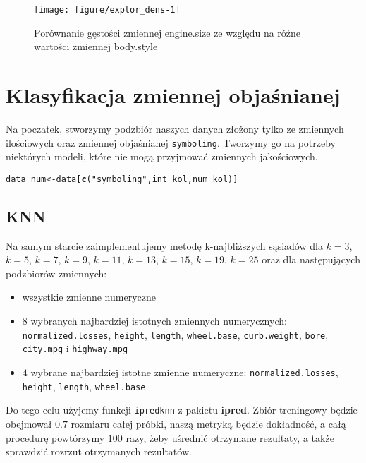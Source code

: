 \documentclass[12pt, a4paper]{article}\usepackage[]{graphicx}\usepackage[]{xcolor}
\makeatletter
\def\maxwidth{ %
  \ifdim\Gin@nat@width>\linewidth
    \linewidth
  \else
    \Gin@nat@width
  \fi
}
\newcommand{\hlstr}[1]{\textcolor[rgb]{0.192,0.494,0.8}{#1}}%
\newcommand{\hlstd}[1]{\textcolor[rgb]{0.345,0.345,0.345}{#1}}%
\newcommand{\hlkwb}[1]{\textcolor[rgb]{0.69,0.353,0.396}{#1}}%
\newcommand{\hlkwd}[1]{\textcolor[rgb]{0.737,0.353,0.396}{\textbf{#1}}}%
\newenvironment{kframe}{%
 \def\at@end@of@kframe{}%
 \ifinner\ifhmode%
  \def\at@end@of@kframe{\end{minipage}}%
  \begin{minipage}{\columnwidth}%
 \fi\fi%
 \def\FrameCommand##1{\hskip\@totalleftmargin \hskip-\fboxsep
 \colorbox{shadecolor}{##1}\hskip-\fboxsep
     \hskip-\linewidth \hskip-\@totalleftmargin \hskip\columnwidth}%
 \MakeFramed {\advance\hsize-\width
   \@totalleftmargin\z@ \linewidth\hsize
   \@setminipage}}%
 {\par\unskip\endMakeFramed%
 \at@end@of@kframe}
\newenvironment{knitrout}{}{} %
\makeatother
\begin{document}
\begin{knitrout}
\color{fgcolor}\begin{figure}[H]

{\centering \texttt{[image: figure/explor\_dens-1]} 

}

\caption[Porównanie gęstości zmiennej engine.size ze względu na różne wartości zmiennej body.style]{Porównanie gęstości zmiennej engine.size ze względu na różne wartości zmiennej body.style}\label{fig:explor_dens}
\end{figure}

\end{knitrout}

\section{Klasyfikacja zmiennej objaśnianej}

Na poczatek, stworzymy podzbiór naszych danych złożony tylko ze zmiennych ilościowych oraz zmiennej objaśnianej \texttt{symboling}. Tworzymy go na potrzeby niektórych modeli, które nie mogą przyjmować zmiennych jakościowych.
\begin{knitrout}
\color{fgcolor}\begin{kframe}
\begin{alltt}
\hlstd{data_num} \hlkwb{<-} \hlstd{data[}\hlkwd{c}\hlstd{(}\hlstr{"symboling"}\hlstd{, int_kol, num_kol)]}
\end{alltt}
\end{kframe}
\end{knitrout}


\subsection{KNN}

Na samym starcie zaimplementujemy metodę k-najbliższych sąsiadów dla $k=3$, $k=5$, $k=7$, $k=9$, $k=11$, $k=13$, $k=15$, $k=19$, $k=25$   oraz dla następujących podzbiorów zmiennych:
\begin{itemize}
\item wszystkie zmienne numeryczne
\item $8$ wybranych najbardziej istotnych zmiennych numerycznych: \texttt{normalized.losses}, \texttt{height}, \texttt{length}, \texttt{wheel.base}, \texttt{curb.weight}, \texttt{bore}, \texttt{city.mpg} i \texttt{highway.mpg}
\item $4$ wybrane najbardziej istotne zmienne numeryczne: \texttt{normalized.losses}, \texttt{height}, \texttt{length}, \texttt{wheel.base}
\end{itemize}
\par
Do tego celu użyjemy funkcji \texttt{ipredknn} z pakietu \textbf{ipred}. Zbiór treningowy będzie obejmował $0.7$ rozmiaru całej próbki, naszą metryką będzie dokładność, a całą procedurę powtórzymy $100$ razy, żeby uśrednić otrzymane rezultaty, a także sprawdzić rozrzut otrzymanych rezultatów.
\end{document}
